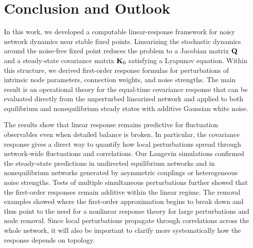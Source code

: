 \section{Conclusion and Outlook}
\quad In this work, we developed a computable linear-response framework for noisy network dynamics near stable fixed points. Linearizing the stochastic dynamics around the noise-free fixed point reduces the problem to a Jacobian matrix ${\bf Q}$ and a steady-state covariance matrix ${\bf K}_0$ satisfying a Lyapunov equation. Within this structure, we derived first-order response formulas for perturbations of intrinsic node parameters, connection weights, and noise strengths. The main result is an operational theory for the equal-time covariance response that can be evaluated directly from the unperturbed linearized network and applied to both equilibrium and nonequilibrium steady states with additive Gaussian white noise.\par
The results show that linear response remains predictive for fluctuation observables even when detailed balance is broken. In particular, the covariance response gives a direct way to quantify how local perturbations spread through network-wide fluctuations and correlations. Our Langevin simulations confirmed the steady-state predictions in undirected equilibrium networks and in nonequilibrium networks generated by asymmetric couplings or heterogeneous noise strengths. Tests of multiple simultaneous perturbations further showed that the first-order responses remain additive within the linear regime. The removal examples showed where the first-order approximation begins to break down and thus point to the need for a nonlinear response theory for large perturbations and node removal. Since local perturbations propagate through correlations across the whole network, it will also be important to clarify more systematically how the response depends on topology.\par
